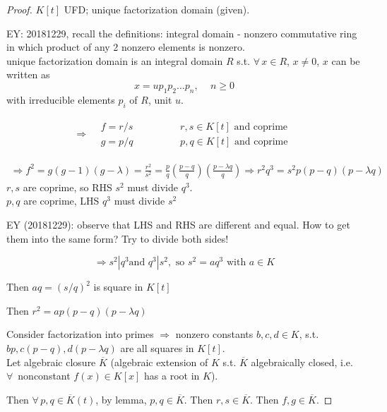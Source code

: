 	\begin{proof}
$K[t]$ UFD; unique factorization domain (given).

EY: 20181229, recall the definitions:
integral domain - nonzero commutative ring in which product of any 2 nonzero elements is nonzero. \\
unique factorization domain is an integral domain $R$ s.t. $\forall \, x \in R$, $x\neq 0$, $x$ can be written as 
\[
x = u p_1 p_2 \dots p_n , \quad \, n \geq 0
\]		
with irreducible elements $p_i$ of $R$, unit $u$.

\[
\begin{gathered}
\Longrightarrow \begin{aligned} & f = r/s \\ & g = p /q \end{aligned} \qquad \quad \, 
\begin{aligned}
& r,s \in K[t] \text{ and coprime } \\
& p,q \in K[t] \text{ and coprime } 
\end{aligned}
\end{gathered}
\]

\[
\begin{gathered}
\Longrightarrow f^2 = g(g-1)(g-\lambda) = \frac{r^2 }{s^2} = \frac{p}{q} \left( \frac{ p-q}{q} \right)\left( \frac{ p - \lambda q}{q} \right) \Longrightarrow r^2 q^3 = s^2 p(p-q)(p-\lambda q)
\end{gathered}
\]
$r,s$ are coprime, so RHS $s^2$ must divide $q^3$. \\
$p,q$ are coprime, LHS $q^3$ must divide $s^2$

EY (20181229): observe that LHS and RHS are different and equal. How to get them into the same form? Try to divide both sides!

\[
\Longrightarrow s^2 | q^3 \text{and } q^3 | s^2, \text{ so } s^2 = aq^3 \text{ with } a \in K
\]

Then $aq = (s/q)^2$ is square in $K[t]$

Then $r^2 = ap(p-q)(p-\lambda q)$

Consider factorization into primes $\Longrightarrow$ nonzero constants $b,c,d \in K$, s.t. $bp, c(p-q), d(p-\lambda q)$ are all squares in $K[t]$. \\
Let algebraic closure $\overline{K}$ (algebraic extension of $K$ s.t. $\overline{K}$ algebraically closed, i.e. $\forall \, $ nonconstant $f(x) \in K[x]$ has a root in $K$).

Then $\forall \, p, q \in \overline{K}(t)$, by lemma, $p,q \in \overline{K}$. Then $r,s \in \overline{K}$.  Then $\boxed{ f, g \in \overline{K}}$.

		\end{proof}
	


